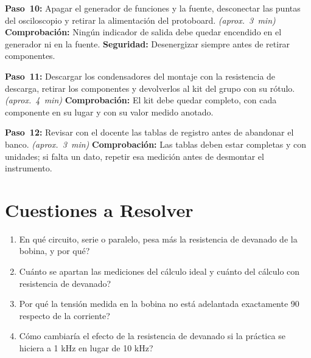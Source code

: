 \documentclass[12pt]{article}
\begin{document}
\begin{pasos}
  \item \textbf{Paso~10:} Apagar el generador de funciones y la fuente, desconectar las puntas del osciloscopio y retirar la alimentación del protoboard. \emph{(aprox.~\SI{3}{\minute})} \textbf{Comprobación:} Ningún indicador de salida debe quedar encendido en el generador ni en la fuente. \textbf{Seguridad:} Desenergizar siempre antes de retirar componentes.
  \item \textbf{Paso~11:} Descargar los condensadores del montaje con la resistencia de descarga, retirar los componentes y devolverlos al kit del grupo con su rótulo. \emph{(aprox.~\SI{4}{\minute})} \textbf{Comprobación:} El kit debe quedar completo, con cada componente en su lugar y con su valor medido anotado.
  \item \textbf{Paso~12:} Revisar con el docente las tablas de registro antes de abandonar el banco. \emph{(aprox.~\SI{3}{\minute})} \textbf{Comprobación:} Las tablas deben estar completas y con unidades; si falta un dato, repetir esa medición antes de desmontar el instrumento.
\end{pasos}

\section{Cuestiones a Resolver}\label{sec:cuestiones}
\begin{enumerate}
  \item \textquestiondown{}En qué circuito, serie o paralelo, pesa más la resistencia de devanado de la bobina, y por qué?
  \item \textquestiondown{}Cuánto se apartan las mediciones del cálculo ideal y cuánto del cálculo con resistencia de devanado?
  \item \textquestiondown{}Por qué la tensión medida en la bobina no está adelantada exactamente 90\textdegree{} respecto de la corriente?
  \item \textquestiondown{}Cómo cambiaría el efecto de la resistencia de devanado si la práctica se hiciera a 1 kHz en lugar de 10 kHz?
\end{enumerate}

\end{document}
